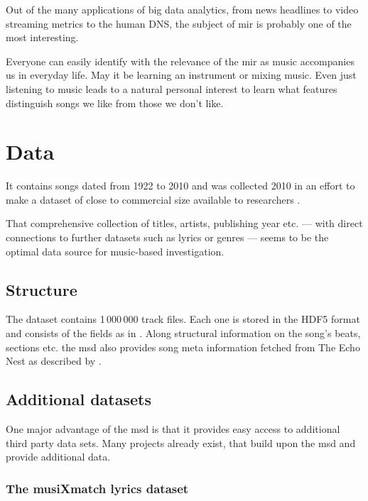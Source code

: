 \documentclass[                                                             %
        12pt,                                                                   %
        twoside                                                                 %
    ]{scrartcl}                                                                 %
\begin{document}
Out of the many applications of big data analytics,
from news headlines to video streaming metrics 
to the human DNS,
the subject of \gls{mir} is probably one of the most interesting.

Everyone can easily identify with the relevance of the \gls{mir}
as music accompanies us in everyday life.
May it be learning an instrument or mixing music.
Even just listening to music 
leads to a natural personal interest 
to learn what features distinguish songs we like 
from those we don't like.

\section{Data}

\parencite{bertin2012million}
It contains songs dated from 1922 to 2010 
and was collected 2010 in an effort to make a dataset 
of close to commercial size
available to researchers \parencite[591]{bertin2011million}.

That comprehensive collection of titles, artists, publishing year etc. 
--- with direct connections to further datasets 
such as lyrics or genres --- seems to be the optimal data source 
for music-based investigation.

\subsection{Structure}

The dataset contains 1\,000\,000 track files. 
Each one is stored in the HDF5 format \parencite{hdfgroup2018hdf5} 
and consists of the fields as in \textcite{bertin2012field}.
Along structural information on the song's beats, sections etc. 
the \gls{msd} also provides song meta information fetched 
from The Echo Nest as described by \textcite[592]{bertin2011million}.

\subsection{Additional datasets}

One major advantage of the \gls{msd} is 
that it provides easy access to 
additional third party data sets.
Many projects already exist, 
that build upon the \gls{msd} 
and provide additional data.

\subsubsection{The musiXmatch lyrics dataset}
\end{document}
